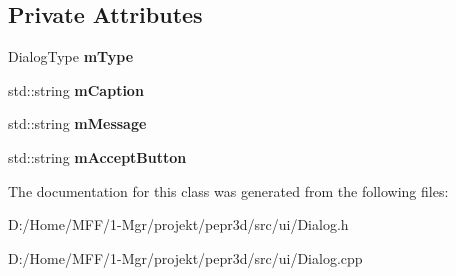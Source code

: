 \subsection*{Private Attributes}
\begin{DoxyCompactItemize}
\item 
\mbox{\label{classpepr3d_1_1_dialog_a8dac2f03ef5c80024135b71b7ff183b2}} 
Dialog\+Type {\bfseries m\+Type}
\item 
\mbox{\label{classpepr3d_1_1_dialog_afd033d0e47cb9566bf2e066c2c316653}} 
std\+::string {\bfseries m\+Caption}
\item 
\mbox{\label{classpepr3d_1_1_dialog_a13c34841e99aac2877842585ecd49451}} 
std\+::string {\bfseries m\+Message}
\item 
\mbox{\label{classpepr3d_1_1_dialog_a3676a0eaba149cbd1a5b611ca10360e3}} 
std\+::string {\bfseries m\+Accept\+Button}
\end{DoxyCompactItemize}


The documentation for this class was generated from the following files\+:\begin{DoxyCompactItemize}
\item 
D\+:/\+Home/\+M\+F\+F/1-\/\+Mgr/projekt/pepr3d/src/ui/Dialog.\+h\item 
D\+:/\+Home/\+M\+F\+F/1-\/\+Mgr/projekt/pepr3d/src/ui/Dialog.\+cpp\end{DoxyCompactItemize}
